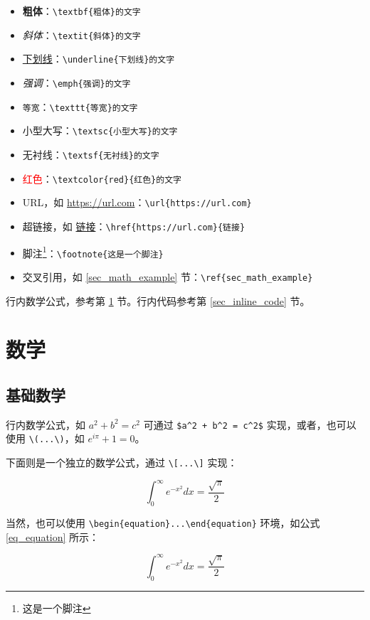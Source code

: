 \documentclass[12]{ctexart}
\begin{document}
\begin{itemize}
    \item \textbf{粗体}：\verb|\textbf{粗体}的文字|
    \item \textit{斜体}：\verb|\textit{斜体}的文字|
    \item \underline{下划线}：\verb|\underline{下划线}的文字|
    \item \emph{强调}：\verb|\emph{强调}的文字|
    \item \texttt{等宽}：\verb|\texttt{等宽}的文字|
    \item \textsc{小型大写}：\verb|\textsc{小型大写}的文字|
    \item \textsf{无衬线}：\verb|\textsf{无衬线}的文字|
    \item \textcolor{red}{红色}：\verb|\textcolor{red}{红色}的文字|
    \item URL，如 \url{https://url.com}：\verb|\url{https://url.com}|
    \item 超链接，如 \href{https://url.com}{链接}：\verb|\href{https://url.com}{链接}|
    \item 脚注\footnote{这是一个脚注}：\verb|\footnote{这是一个脚注}|
    \item 交叉引用，如 \ref{sec_math_example} 节：\verb|\ref{sec_math_example}|
\end{itemize}

行内数学公式，参考第 \ref{sec_math} 节。行内代码参考第 \ref{sec_inline_code} 节。

\section{数学}\label{sec_math}

\subsection{基础数学}

行内数学公式，如 $a^2 + b^2 = c^2$ 可通过 \verb|$a^2 + b^2 = c^2$| 实现，或者，也可以使用 \verb$\(...\)$，如 \( e^{i\pi} + 1 = 0 \)。

下面则是一个独立的数学公式，通过 \verb$\[...\]$ 实现：

\[
    \int_{0}^{\infty} e^{-x^2} dx = \frac{\sqrt{\pi}}{2}
\]

当然，也可以使用 \verb$\begin{equation}...\end{equation}$ 环境，如公式 \ref{eq_equation} 所示：

\begin{equation}\label{eq_equation}
    \int_{0}^{\infty} e^{-x^2} dx = \frac{\sqrt{\pi}}{2}
\end{equation}
\end{document}
